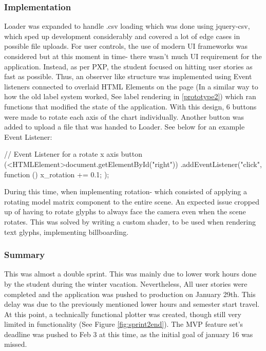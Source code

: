 \subsubsection{Implementation}
Loader was expanded to handle .csv loading which was done using jquery-csv, which sped up development considerably and covered a lot of edge cases in possible file uploads. For user controls, the use of modern UI frameworks was considered but at this moment in time- there wasn't much UI requirement for the application. Instead, as per PXP, the student focused on hitting user stories as fast as possible. Thus, an observer like structure was implemented using Event listeners connected to overlaid HTML Elements on the page (In a similar way to how the old label system worked, See label rendering in \ref{prototype2}) which ran functions that modified the state of the application. With this design, 6 buttons were made to rotate each axis of the chart individually. Another button was added to upload a file that was handed to Loader. See below for an example Event Listener:

\begin{code}
    // Event Listener for a rotate x axis button
    (<HTMLElement>document.getElementById("right"))
    .addEventListener("click", function () {
            x_rotation += 0.1;
        });
\end{code}

During this time, when implementing rotation- which consisted of applying a rotating model matrix component to the entire scene. An expected issue cropped up of having to rotate glyphs to always face the camera even when the scene rotates. This was solved by writing a custom shader, to be used when rendering text glyphs, implementing billboarding.

\subsubsection{Summary}
This was almost a double sprint. This was mainly due to lower work hours done by the student during the winter vacation. Nevertheless, All user stories were completed and the application was pushed to production on January 29th. This delay was due to the previously mentioned lower hours and semester start travel. At this point, a technically functional plotter was created, though still very limited in functionality (See Figure \ref{fig:sprint2end}).
The MVP feature set's deadline was pushed to Feb 3 at this time, as the initial goal of january 16 was missed.

